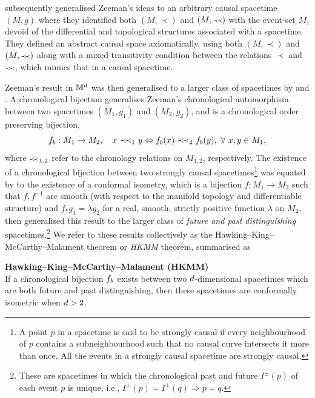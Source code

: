 \cite{kp} subsequently generalised
Zeeman's ideas to an arbitrary causal spacetime $(M,g)$ where they identified both $(M,\prec)$ and $(M,\pprec)$ with
the event-set $M$,  devoid of the differential and topological structures associated with a
spacetime. They defined an abstract causal space axiomatically, using both 
$(M,\prec)$ and $(M,\pprec)$ along with a mixed
transitivity condition between the relations $\prec$ and $\pprec$, which mimics that in a causal spacetime.




Zeeman's result in $\mathbb M^d$ was then generalised to a larger class of spacetimes by
\cite{hkm} and \cite{malament}. A chronological bijection generalises Zeeman's
chronological automorphism between two 
spacetimes $(M_1,g_1)$ and $(M_2,g_2)$, and is a chronological order preserving bijection, 
\begin{equation}
 \fcb :M_1 \rightarrow M_2, \quad x \, \,\pprec_1 \, \, y \Leftrightarrow \fcb(x) \, \,\pprec_2 \, \,\fcb(y), \, \, \forall \, \, x,y \in
 M_1, 
\end{equation}
where $\pprec_{1,2}$ refer to the chronology relations on $M_{1,2}$, respectively. 
The existence of a chronological bijection between two strongly causal spacetimes\footnote{A point $p$ in a spacetime is
  said to be strongly causal if every neighbourhood of $p$ contains a subneighbourhood such that no causal curve
  intersects it more than once. All the events in a  strongly causal spacetime are strongly causal.} was equated by  \cite{hkm} to the
existence of a {conformal isometry}, which is a bijection $f:M_1\rightarrow M_2 $ such that $f, f^{-1}$ are smooth (with
respect to the manifold topology and differentiable structure) and $f_*g_1=\lambda g_2$ for a real, smooth, strictly positive function
$\lambda $ on $M_2$. \cite{malament}  then generalised this result to the larger class of \emph{future and past
 distinguishing}  spacetimes.\footnote{These are spacetimes in which the
chronological past and future $I^\pm(p)$ of each event $p$ is unique,
i.e., $I^\pm(p)=I^\pm(q) \Rightarrow p=q$.} 
We refer to these results collectively as the Hawking--King--McCarthy--Malament theorem or \emph{HKMM} theorem, summarised as 

\begin{theorem} {\bf Hawking--King--McCarthy--Malament (HKMM)} \\
If a chronological bijection $f_b$ exists between two $d$-dimensional spacetimes which are both future and
past distinguishing, then these spacetimes are conformally isometric when $d>2$. \label{HKMM}
\end{theorem} 


